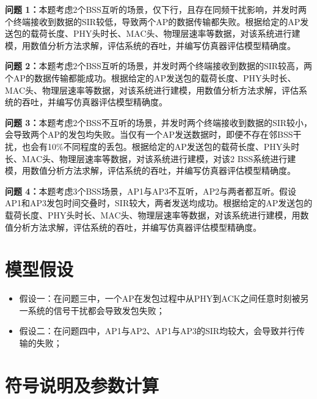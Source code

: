 \documentclass[bwprint]{gmcmthesis}
\begin{document}
\textbf{问题 1：}本题考虑2个BSS互听的场景，仅下行，且存在同频干扰影响，并发时两个终端接收到数据的SIR较低，导致两个AP的数据传输都失败。根据给定的AP发送包的载荷长度、PHY头时长、MAC头、物理层速率等数据，对该系统进行建模，用数值分析方法求解，评估系统的吞吐，并编写仿真器评估模型精确度。

\textbf{问题 2：}本题考虑2个BSS互听的场景，并发时两个终端接收到数据的SIR较高，两个AP的数据传输都能成功。根据给定的AP发送包的载荷长度、PHY头时长、MAC头、物理层速率等数据，对该系统进行建模，用数值分析方法求解，评估系统的吞吐，并编写仿真器评估模型精确度。

\textbf{问题 3：}本题考虑2个BSS不互听的场景，并发时两个终端接收到数据的SIR较小，会导致两个AP的发包均失败。当仅有一个AP发送数据时，即便不存在邻BSS干扰，也会有10\%不同程度的丢包。根据给定的AP发送包的载荷长度、PHY头时长、MAC头、物理层速率等数据，对该系统进行建模，对该2 BSS系统进行建模，用数值分析方法求解，评估系统的吞吐，并编写仿真器评估模型精确度。

\textbf{问题 4：}本题考虑3个BSS场景，AP1与AP3不互听，AP2与两者都互听。假设AP1和AP3发包时间交叠时，SIR较大，两者发送均成功。根据给定的AP发送包的载荷长度、PHY头时长、MAC头、物理层速率等数据，对该系统进行建模，用数值分析方法求解，评估系统的吞吐，并编写仿真器评估模型精确度。

\section{模型假设}

\begin{itemize}
\item 假设一：在问题三中，一个AP在发包过程中从PHY到ACK之间任意时刻被另一系统的信号干扰都会导致发包失败；
\item 假设二：在问题四中，AP1与AP2、AP1与AP3的SIR均较大，会导致并行传输的失败；
\end{itemize}

\section{符号说明及参数计算}
\end{document}
